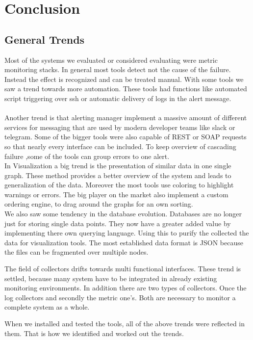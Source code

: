 
\chapter{Conclusion}\label{chap:conclusion}
\section{General Trends}
Most of the systems we evaluated or considered evaluating were metric monitoring stacks. In general most tools detect not the cause of the failure. Instead the effect is recognized and can be treated manual. With some tools we saw a trend towards more automation. These tools had functions like automated script triggering over ssh or automatic delivery of logs in the alert message. \\
\\
Another trend is that alerting manager implement a massive amount of different services for messaging that are used by modern developer teams like slack or telegram. Some of the bigger tools were also capable of REST or SOAP requests so that nearly every interface can be included. To keep overview of cascading failure ,some of the tools can group errors to one alert.
\\
In Visualization a big trend is the presentation of similar data in one single graph. These method provides a better overview of the system and leads to generalization of the data. Moreover the most tools use coloring to highlight warnings or errors. The big player on the market also implement a custom ordering engine, to drag around the graphs for an own sorting.
\\
We also saw some tendency in the database evolution. Databases are no longer just for storing single data points. They now have a greater added value by implementing there own querying language. Using this to purify the collected the data for visualization tools. The most established data format is JSON because the files can be fragmented over multiple nodes.

The field of collectors drifts towards multi functional interfaces. These trend is settled, because many system have to be integrated in already existing monitoring environments. In addition there are two types of collectors. Once the log collectors and secondly the metric one's. Both are necessary to monitor a complete system as a whole.

When we installed and tested the tools, all of the above trends were reflected in them. That is how we identified and worked out the trends. 


